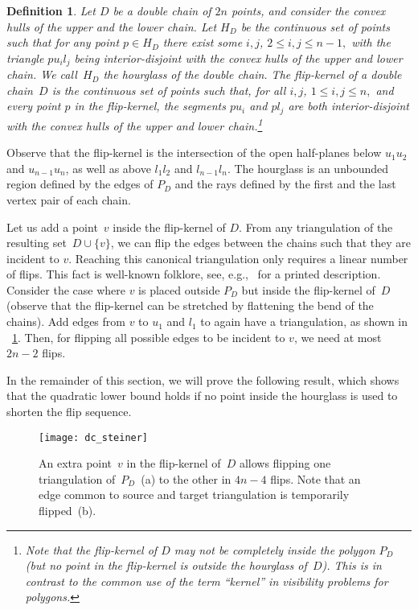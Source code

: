 \documentclass[11pt,a4paper]{article}
\newtheorem{definition}{Definition}
\begin{document}
\begin{definition}\label{def_dc}
Let $D$ be a double chain of $2n$ points, and consider the convex hulls of the upper and the lower chain.
Let $H_D$ be the continuous set of points such that for any point $p \in H_D$ there exist some $i,j$, $2 \leq i,j \leq n-1,$ with the triangle $p u_i l_j$ being interior-disjoint with the convex hulls of the upper and lower chain.
We call~$H_D$ the \emph{hourglass} of the double chain.
The \emph{flip-kernel of a double chain}~$D$ is the continuous set of points such that, for all $i,j$, $1 \leq i,j \leq n,$ and every point $p$ in the flip-kernel, the segments $p u_i$ and $p l_j$ are both interior-disjoint with the convex hulls of the upper and lower chain.\footnote{Note that the flip-kernel of $D$ may not be completely inside the polygon $P_D$ (but no point in the flip-kernel is outside the hourglass of~$D$).
This is in contrast to the common use of the term ``kernel'' in visibility problems for polygons.}
\end{definition}

Observe that the flip-kernel is the intersection of the open half-planes below $u_1 u_2$ and $u_{n-1} u_n$, as well as above $l_1 l_2$ and $l_{n-1} l_n$.
The hourglass is an unbounded region defined by the edges of $P_D$ and the rays defined by the first and the last vertex pair of each chain.

Let us add a point~$v$ inside the flip-kernel of $D$.
From any triangulation of the resulting set~$D \cup \{v\}$, we can flip the edges between the chains such that they are incident to $v$.
Reaching this canonical triangulation only requires a linear number of flips.
This fact is well-known folklore, see, e.g.,~\cite{problemas} for a printed description.
Consider the case where $v$ is placed outside $P_D$ but inside the flip-kernel of~$D$ (observe that the flip-kernel can be stretched by flattening the bend of the chains).
Add edges from $v$ to $u_1$ and $l_1$ to again have a triangulation, as shown in \figurename~\ref{fig_dc_steiner}.
Then, for flipping all possible edges to be incident to $v$, we need at most $2n-2$ flips.

In the remainder of this section, we will prove the following result, which shows that the quadratic lower bound holds if no point inside the hourglass is used to shorten the flip sequence.

\begin{figure}
\centering
\texttt{[image: dc\_steiner]}
\caption{An extra point~$v$ in the flip-kernel of~$D$ allows flipping one triangulation of~$P_D$~(a) to the other in $4n-4$ flips.
Note that an edge common to source and target triangulation is temporarily flipped~(b).}
\label{fig_dc_steiner}
\end{figure}
\end{document}
